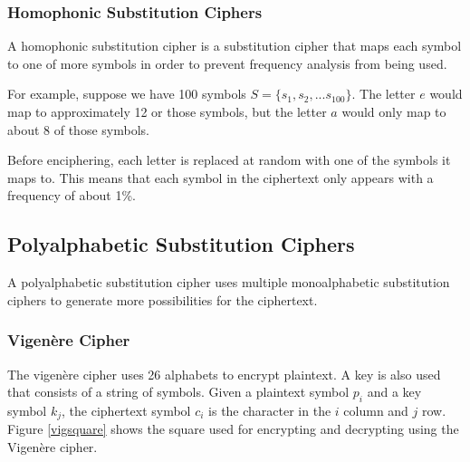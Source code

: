 \documentclass[12pt]{article}
\begin{document}
\subsubsection{Homophonic Substitution Ciphers}
A homophonic substitution cipher is a substitution cipher that maps each symbol to one of more symbols in order to prevent frequency analysis from being used. 

For example, suppose we have 100 symbols $S=\{s_1,s_2,...s_{100}\}$. The letter $e$ would map to approximately 12 or those symbols, but the letter $a$ would only map to about 8 of those symbols.

Before enciphering, each letter is replaced at random with one of the symbols it maps to. This means that each symbol in the ciphertext only appears with a frequency of about 1\%.

\subsection{Polyalphabetic Substitution Ciphers}
A polyalphabetic substitution cipher uses multiple monoalphabetic substitution ciphers to generate more possibilities for the ciphertext.

\subsubsection{Vigen\`{e}re Cipher}
The vigen\`{e}re cipher uses 26 alphabets to encrypt plaintext. A key is also used that consists of a string of symbols. Given a plaintext symbol $p_i$ and a key symbol $k_j$, the ciphertext symbol $c_i$ is the character in the $i$ column and $j$ row.
Figure \ref{vigsquare} shows the square used for encrypting and decrypting using the Vigen\`{e}re cipher.
\end{document}
